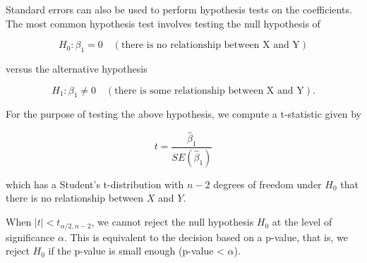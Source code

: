 \documentclass[11pt]{article}
\begin{document}
Standard errors can also be used to perform hypothesis tests on the coefficients. The most common hypothesis test involves testing the null hypothesis of

\[H_0: \beta_1 = 0 \quad (\text{there is no relationship between X and Y})\]

versus the alternative hypothesis

\[H_1: \beta_1 \neq 0 \quad (\text{there is some relationship between X and Y}).\]

For the purpose of testing the above hypothesis, we compute a t-statistic given by

\[t = \frac{\hat{\beta}_1}{SE(\hat{\beta}_1)}\]

which has a Student's t-distribution with \(n - 2\) degrees of freedom under \(H_0\) that there is no relationship between \(X\) and \(Y\).

When \( |t| < t_{\alpha/2,n-2} \), we cannot reject the null hypothesis \( H_0 \) at the level of significance \(\alpha\). This is equivalent to the decision based on a p-value, that is, we reject \( H_0 \) if the p-value is small enough (p-value < \( \alpha \)).
\end{document}
